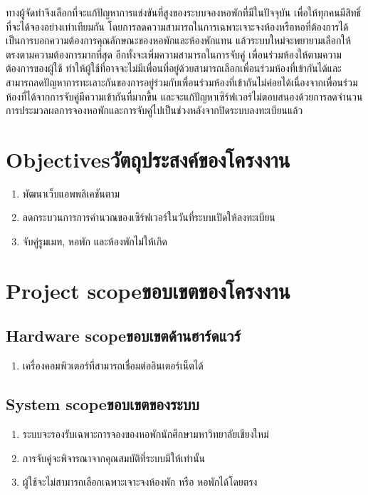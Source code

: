 ทางผู้จัดทำจึงเลือกที่จะแก้ปัญหาการแข่งขันที่สูงของระบบจองหอพักที่มีในปัจจุบัน เพื่อให้ทุกคนมีสิทธิ์ที่จะได้จองอย่างเท่าเทียมกัน
โดยการลดความสามารถในการเฉพาะเจาะจงห้องหรือหอที่ต้องการได้ เป็นการบอกความต้องการคุณลักษณะของหอพักและห้องพักแทน
แล้วระบบใหม่จะพยายามเลือกให้ตรงตามความต้องการมากที่สุด อีกทั้งจะเพิ่มความสามารถในการจับคู่
เพื่อนร่วมห้องให้ตามความต้องการของผู้ใช้ ทำให้ผู้ใช้ที่อาจจะไม่มีเพื่อนที่อยู่ด้วยสามารถเลือกเพื่อนร่วมห้องที่เข้ากันได้และ
สามารถลดปัญหาการทะเลาะกันของการอยู่ร่วมกับเพื่อนร่วมห้องที่เข้ากันไม่ค่อยได้เนื่องจากเพื่อนร่วมห้องที่ได้จากการจับคู่มีความเข้ากันที่มากขึ้น
และจะแก้ปัญหาเซิร์ฟเวอร์ไม่ตอบสนองด้วยการลดจำนวนการประมวลผลการจองหอพักและการจับคู่ไปเป็นช่วงหลังจากปิดระบบลงทะเบียนแล้ว

\section{\ifenglish Objectives\else วัตถุประสงค์ของโครงงาน\fi}
\begin{enumerate}
    \item พัฒนาเว็บแอพพลิเคชันตาม
    \item ลดกระบวนการการคำนวณของเซิร์ฟเวอร์ในวันที่ระบบเปิดให้ลงทะเบียน
    \item จับคู่รูมเมท, หอพัก และห้องพักไม่ให้เกิด 
\end{enumerate}

\section{\ifenglish Project scope\else ขอบเขตของโครงงาน\fi}
\subsection{\ifenglish Hardware scope\else ขอบเขตด้านฮาร์ดแวร์\fi}
\begin{enumerate}
    \item เครื่องคอมพิวเตอร์ที่สามารถเชื่อมต่ออินเตอร์เน็ตได้
\end{enumerate}
\subsection{\ifenglish System scope\else ขอบเขตของระบบ\fi}
\begin{enumerate}
    \item ระบบจะรองรับเฉพาะการจองของหอพักนักศึกษามหาวิทยาลัยเชียงใหม่
    \item การจับคู่จะพิจารณาจากคุณสมบัติที่ระบบมีให้เท่านั้น
    \item ผู้ใช้จะไม่สามารถเลือกเฉพาะเจาะจงห้องพัก หรือ หอพักได้โดยตรง
\end{enumerate}

